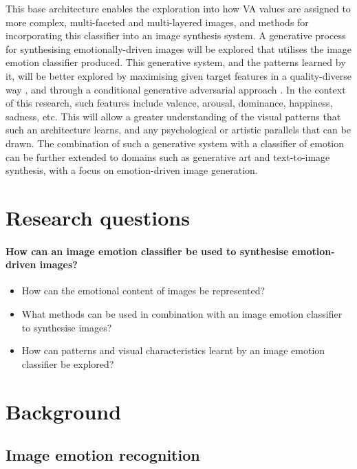 \documentclass{article}
\begin{document}
This base architecture enables the exploration into how VA values are assigned to more complex, multi-faceted and multi-layered images, and methods for incorporating this classifier into an image synthesis system.
A generative process for synthesising emotionally-driven images will be explored that utilises the image emotion classifier produced.
This generative system, and the patterns learned by it, will be better explored by maximising given target features in a quality-diverse way \citep{nguyen2015innovation, nguyen2015deep}, and through a conditional generative adversarial approach \citep{tan2017artgan, gan2017stylenet}.
In the context of this research, such features include valence, arousal, dominance, happiness, sadness, etc.
This will allow a greater understanding of the visual patterns that such an architecture learns, and any psychological or artistic parallels that can be drawn.
The combination of such a generative system with a classifier of emotion can be further extended to domains such as generative art and text-to-image synthesis, with a focus on emotion-driven image generation.

\section{Research questions}

\paragraph{How can an image emotion classifier be used to synthesise emotion-driven images?}
\begin{itemize}
	\item How can the emotional content of images be represented?
	\item What methods can be used in combination with an image emotion classifier to synthesise images?
	\item How can patterns and visual characteristics learnt by an image emotion classifier be explored?
\end{itemize}


\section{Background}

\subsection{Image emotion recognition}
\end{document}
